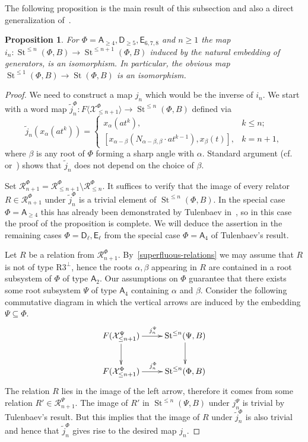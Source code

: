 \documentclass[oneside, 8pt]{amsart}
\newtheorem{prop}[lemma]{Proposition}
\theoremstyle{remark}
\theoremstyle{definition}
\numberwithin{lemma}{section}
\numberwithin{prop}{section}
\numberwithin{corollary}{section}
\numberwithin{externaltheorem}{section}
\DeclareMathOperator{\St}{St}
\newcommand{\rA}{\mathsf{A}}
\newcommand{\rD}{\mathsf{D}}
\newcommand{\rE}{\mathsf{E}}
\numberwithin{equation}{section}
\begin{document}
The following proposition is the main result of this subsection and also a direct generalization of~\cite[Lemma~3.3]{Tu83}.
\begin{prop} \label{lemma33} For $\Phi=\rA_{\geq 4}, \rD_{\geq 5}, \rE_{6,7,8}$ and $n \geq 1$ the map $i_n\colon \St^{\leq n}(\Phi, B) \to \St^{\leq n+1}(\Phi, B)$ induced by the natural embedding of generators, is an isomorphism. In particular, the obvious map $\St^{\leq 1}(\Phi, B) \to \St(\Phi, B)$ is an isomorphism. \end{prop}
\begin{proof}
 We need to construct a map $j_n$ which would be the inverse of $i_n$. 
 We start with a word map $\widetilde{j}_n^\Phi \colon F\langle \mathcal{X}^\Phi_{\leq n+1} \rangle \to \St^{\leq n}(\Phi, B)$ defined via
 \[ \widetilde{j}_n(x_\alpha(at^k)) = \begin{cases} x_\alpha(at^k), & k\leq n; \\
      [x_{\alpha - \beta} (N_{\alpha-\beta, \beta} \cdot at^{k-1}), x_{\beta}(t)], & k = n+1, \end{cases} \]
 where $\beta$ is any root of $\Phi$ forming a sharp angle with $\alpha$.
 Standard argument (cf.~\cite[Proposition~1.1]{Re75} or~\cite[Proposition~3.2.2]{RS76}) shows that $\widetilde{j}_n$ does not depend on the choice of $\beta$.
 
 Set $\mathcal{R}^\Phi_{n+1} = \mathcal{R}^\Phi_{\leq n+1} \setminus \mathcal{R}^\Phi_{\leq n}$. It suffices to verify that the image of every relator $R \in \mathcal{R}^\Phi_{n+1}$ under $\widetilde{j}^\Phi_n$ is a trivial element of $\St^{\leq n}(\Phi, B)$. In the special case $\Phi=\rA_{\geq 4}$ this has already been demonstrated by Tulenbaev in~\cite[Lemma~3.3]{Tu83}, so in this case the proof of the proposition is complete. We will deduce the assertion in the remaining cases $\Phi=\rD_\ell,\rE_\ell$ from the special case $\Phi=\rA_4$ of Tulenbaev's result.
 
 Let $R$ be a relation from $\mathcal{R}^\Phi_{n+1}$. By~\cref{superfluous-relations} we may assume that $R$ is not of type $\text{R3}^\bot$, hence the roots $\alpha, \beta$ appearing in $R$ are contained in a root subsystem of $\Phi$ of type $\rA_2$. Our assumptions on $\Phi$ guarantee that there exists some root subsystem $\Psi$ of type $\rA_4$ containing $\alpha$ and $\beta$. Consider the following commutative diagram in which the vertical arrows are induced by the embedding $\Psi\subseteq\Phi$. 
  \begin{equation} \nonumber \xymatrix{
 F(\mathcal{X}_{\leq n+1}^\Psi) \ar[r]^{j_n^\Psi} \ar[d] & \St^{\leq n}(\Psi, B) \ar[d] \\
 F(\mathcal{X}_{\leq n+1}^\Phi) \ar[r]^{j_n^\Phi} & \St^{\leq n}(\Phi, B) }
 \end{equation}
The relation $R$ lies in the image of the left arrow, therefore it comes from some relation $R' \in \mathcal{R}^\Psi_{n+1}$. The image of $R'$ in $\St^{\leq n}(\Psi, B)$ under $j_n^\Psi$ is trivial by Tulenbaev's result. But this implies that the image of $R$ under $\widetilde{j}_n^\Phi$ is also trivial and hence that $\widetilde{j}_n^\Phi$ gives rise to the desired map $j_n$.
\end{proof}
\end{document}
